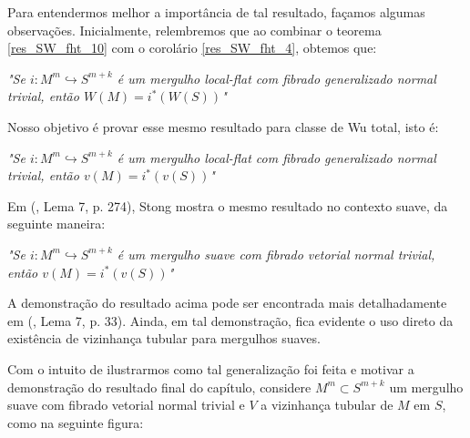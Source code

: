 \documentclass[12pt,oneside]{book} %
\begin{document}
\par Para entendermos melhor a importância de tal resultado, façamos algumas observações. Inicialmente, relembremos que ao combinar o teorema \ref{res_SW_fht_10} com o corolário \ref{res_SW_fht_4}, obtemos que:

\begin{center}
	\begin{minipage}{10cm}
		\textit{"Se $i:M^{m}\hookrightarrow S^{m+k}$ é um mergulho local-flat com fibrado generalizado normal trivial, então $W(M)=i^{*}(W(S))$"}
	\end{minipage}
\end{center}

\par Nosso objetivo é provar esse mesmo resultado para classe de Wu total, isto é:

\begin{center}
	\begin{minipage}{10cm}
		\textit{"Se $i:M^{m}\hookrightarrow S^{m+k}$ é um mergulho local-flat com fibrado generalizado normal trivial, então $v(M)=i^{*}(v(S))$"}
	\end{minipage}
\end{center}

\par Em (\cite{stong}, Lema 7, p. 274), Stong mostra o mesmo resultado no contexto suave, da seguinte maneira:

\begin{center}
	\begin{minipage}{10cm}
		\textit{"Se $i:M^{m}\hookrightarrow S^{m+k}$ é um mergulho suave com fibrado vetorial normal trivial, então $v(M)=i^{*}(v(S))$"}
	\end{minipage}
\end{center}

\par A demonstração do resultado acima pode ser encontrada mais detalhadamente em (\cite{joao}, Lema 7, p. 33). Ainda, em tal demonstração, fica evidente o uso direto da existência de vizinhança tubular para mergulhos suaves.

\par Com o intuito de ilustrarmos como tal generalização foi feita e motivar a demonstração do resultado final do capítulo, considere $M^{m}\subset S^{m+k}$ um mergulho suave com fibrado vetorial normal trivial e $V$ a vizinhança tubular de $M$ em $S$, como na seguinte figura: \newline
\end{document}

